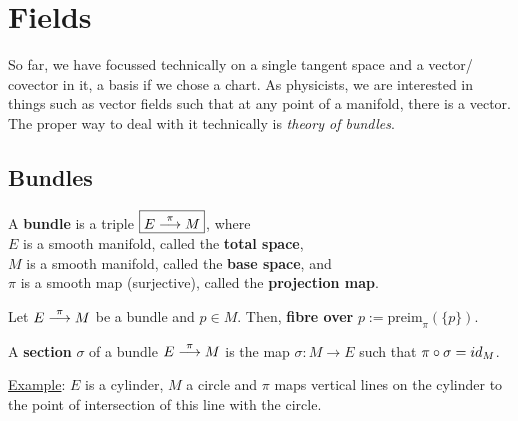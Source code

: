 \section{Fields}

So far, we have focussed technically on a single tangent space and a vector/ covector in it, a basis if we chose a chart. As physicists, we are interested in things such as vector fields such that at any point of a manifold, there is a vector. The proper way to deal with it technically is \textit{theory of bundles}.

\subsection{Bundles}

\begin{definition}
A \textbf{bundle} is a triple $\boxed{E \stackrel{\pi}{\longrightarrow} M}$, where \\
$E$ is a smooth manifold, called the \textbf{total space}, \\
$M$ is a smooth manifold, called the \textbf{base space}, and \\
$\pi$ is a smooth map (surjective), called the \textbf{projection map}. \\
\end{definition}

\begin{definition}
Let $E \stackrel{\pi}{\longrightarrow} M$ be a bundle and $p \in M$. Then, \textbf{fibre over} $p := \text{preim}_{\pi}(\lbrace p \rbrace)$. \\
\end{definition}

\begin{definition}
A \textbf{section} $\sigma$ of a bundle $E \stackrel{\pi}{\longrightarrow} M$ is the map $\sigma : M \to E$ such that $\pi \circ \sigma = id_M$. \\
\end{definition}


\underline{Example}: $E$ is a cylinder, $M$ a circle and $\pi$ maps vertical lines on the cylinder to the point of intersection of this line with the circle.

